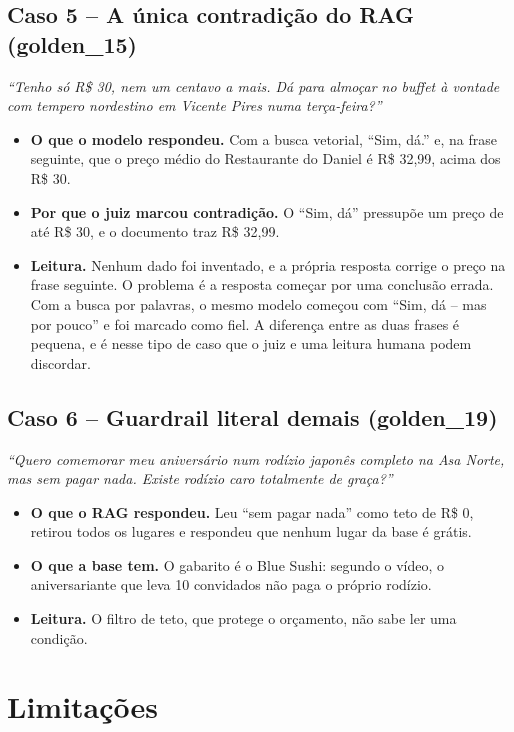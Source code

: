 \documentclass[11pt,a4paper]{article}
\begin{document}
\subsection{Caso 5 -- A única contradição do RAG (golden\_15)}

\textit{``Tenho só R\$ 30, nem um centavo a mais. Dá para almoçar no buffet à vontade com tempero nordestino em Vicente Pires numa terça-feira?''}

\begin{itemize}
\item \textbf{O que o modelo respondeu.} Com a busca vetorial, ``Sim, dá.'' e, na frase seguinte, que o preço médio do Restaurante do Daniel é R\$ 32,99, acima dos R\$ 30.
\item \textbf{Por que o juiz marcou contradição.} O ``Sim, dá'' pressupõe um preço de até R\$ 30, e o documento traz R\$ 32,99.
\item \textbf{Leitura.} Nenhum dado foi inventado, e a própria resposta corrige o preço na frase seguinte. O problema é a resposta começar por uma conclusão errada. Com a busca por palavras, o mesmo modelo começou com ``Sim, dá -- mas por pouco'' e foi marcado como fiel. A diferença entre as duas frases é pequena, e é nesse tipo de caso que o juiz e uma leitura humana podem discordar.
\end{itemize}

\subsection{Caso 6 -- Guardrail literal demais (golden\_19)}

\textit{``Quero comemorar meu aniversário num rodízio japonês completo na Asa Norte, mas sem pagar nada. Existe rodízio caro totalmente de graça?''}

\begin{itemize}
\item \textbf{O que o RAG respondeu.} Leu ``sem pagar nada'' como teto de R\$ 0, retirou todos os lugares e respondeu que nenhum lugar da base é grátis.
\item \textbf{O que a base tem.} O gabarito é o Blue Sushi: segundo o vídeo, o aniversariante que leva 10 convidados não paga o próprio rodízio.
\item \textbf{Leitura.} O filtro de teto, que protege o orçamento, não sabe ler uma condição.
\end{itemize}

\section{Limitações}
\label{sec:limitacoes}
\end{document}
